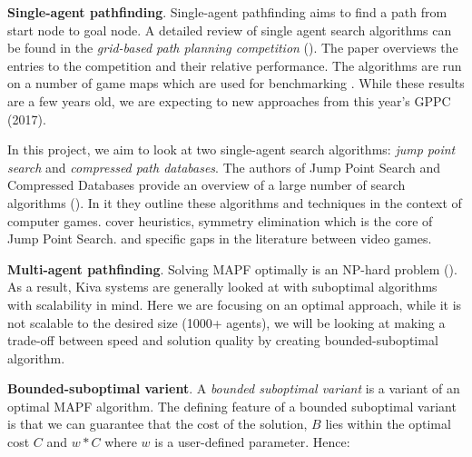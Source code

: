 \documentclass[a4paper,11pt]{article}
\begin{document}
\noindent \textbf{Single-agent pathfinding}. Single-agent pathfinding aims to find a path from start node to goal node. A detailed review of single agent search algorithms can be found in the \textit{grid-based path planning competition} (\cite{sturtevant2015grid}). The paper overviews the entries to the competition and their relative performance. The algorithms are run on a number of game maps which are used for benchmarking \cite{sturtevant2012benchmarks}. While these results are a few years old, we are expecting to new approaches from this year's GPPC (2017).

In this project, we aim to look at two single-agent search algorithms: \textit{jump point search} and \textit{compressed path databases}. The authors of Jump Point Search and Compressed Databases provide an overview of a large number of search algorithms (\cite{botea2013pathfinding}). In it they outline these algorithms and techniques in the context of computer games. cover heuristics, symmetry elimination which is the core of Jump Point Search. and specific gaps in the literature between video games.

%


\noindent \textbf{Multi-agent pathfinding}. Solving MAPF optimally is an NP-hard problem (\cite{yu2013structure}). As a result, Kiva systems are generally looked at with suboptimal algorithms with scalability in mind. Here we are focusing on an optimal approach, while it is not scalable to the desired size (1000+ agents), we will be looking at making a trade-off between speed and solution quality by creating bounded-suboptimal algorithm.


\noindent \textbf{Bounded-suboptimal varient}. A \textit{bounded suboptimal variant} is a variant of an optimal MAPF algorithm. The defining feature of a bounded suboptimal variant is that we can guarantee that the cost of the solution, $B$ lies within the optimal cost $C$ and $w*C$ where $w$ is a user-defined parameter. Hence:
\end{document}
